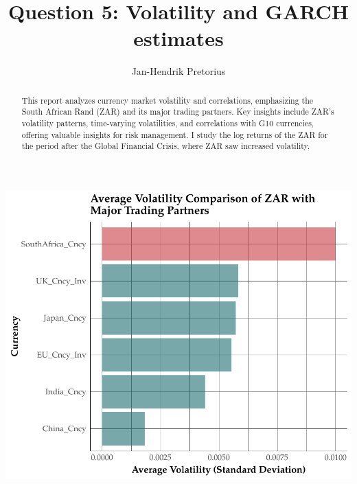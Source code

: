 \documentclass[11pt,preprint, authoryear]{elsarticle}
\numberwithin{equation}{section}
\numberwithin{figure}{section}
\numberwithin{table}{section}
\begin{document}
\begin{frontmatter}  %

\title{Question 5: Volatility and GARCH estimates}





\author[Add1]{Jan-Hendrik Pretorius}





\address[Add1]{Stellenbosch University}


\begin{abstract}
\small{
This report analyzes currency market volatility and correlations,
emphasizing the South African Rand (ZAR) and its major trading partners.
Key insights include ZAR's volatility patterns, time-varying
volatilities, and correlations with G10 currencies, offering valuable
insights for risk management. I study the log returns of the ZAR for the
period after the Global Financial Crisis, where ZAR saw increased
volatility.
}
\end{abstract}

\vspace{1cm}





\vspace{0.5cm}

\end{frontmatter}

\setcounter{footnote}{0}



\pagestyle{fancy}
\chead{}
\lfoot{}
\lhead{}
\cfoot{}


\headsep 35pt %




\includegraphics{Question-5_files/figure-latex/barplot-1.pdf}
\end{document}
